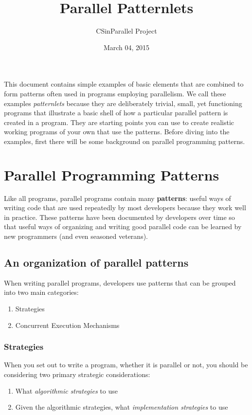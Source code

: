 \documentclass[letterpaper,10pt,openany,oneside]{sphinxmanual}
\title{Parallel Patternlets}
\date{March 04, 2015}
\author{CSinParallel Project}
\begin{document}
\maketitle
\tableofcontents
{}\label{index::doc}


This document contains simple examples of basic elements that are combined to form patterns often used in programs employing parallelism.  We call these examples \emph{patternlets} because they are deliberately trivial, small, yet functioning programs that illustrate a basic shell of how a particular parallel pattern is created in a program.  They are starting points you can use to create realistic working programs of your own that use the patterns.  Before diving into the examples, first there will be some background on parallel programming patterns.


\chapter{Parallel Programming Patterns}
\label{PatternsIntro:parallel-programming-patterns}\label{PatternsIntro::doc}\label{PatternsIntro:parallel-patternlets}
Like all programs, parallel programs contain many \textbf{patterns}: useful ways of writing code that are used repeatedly by most developers because they work well in practice.  These patterns have been documented by developers over time so that useful ways of organizing and writing good parallel code can be learned by new programmers (and even seasoned veterans).


\section{An organization of parallel patterns}
\label{PatternsIntro:an-organization-of-parallel-patterns}
When writing parallel programs, developers use patterns that can be grouped into two main categories:
\begin{enumerate}
\item {} 
Strategies

\item {} 
Concurrent Execution Mechanisms

\end{enumerate}


\subsection{Strategies}
\label{PatternsIntro:strategies}
When you set out to write a program, whether it is parallel or not, you should be considering two primary strategic considerations:
\begin{enumerate}
\item {} 
What \emph{algorithmic strategies} to use

\item {} 
Given the algorithmic strategies, what \emph{implementation strategies} to use

\end{enumerate}
\end{document}
